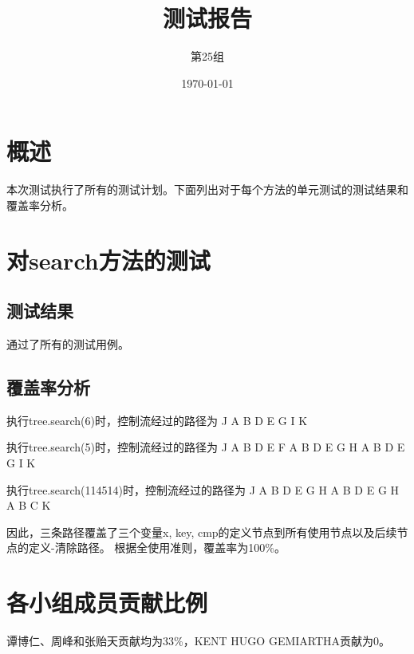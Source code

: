 \documentclass[12pt, a4paper, oneside]{ctexart}
\title{\textbf{测试报告}}
\author{第25组}
\date{\today}
\begin{document}
\maketitle

\section{概述}
本次测试执行了所有的测试计划。下面列出对于每个方法的单元测试的测试结果和覆盖率分析。

\section{对search方法的测试}

\subsection{测试结果}
通过了所有的测试用例。

\subsection{覆盖率分析}
执行tree.search(6)时，控制流经过的路径为 J A B D E G I K

执行tree.search(5)时，控制流经过的路径为 J A B D E F A B D E G H A B D E G I K

执行tree.search(114514)时，控制流经过的路径为 J A B D E G H A B D E G H A B C K

因此，三条路径覆盖了三个变量x, key, cmp的定义节点到所有使用节点以及后续节点的定义-清除路径。
根据全使用准则，覆盖率为100\%。

\section{各小组成员贡献比例}
谭博仁、周峰和张贻天贡献均为33\%，KENT HUGO GEMIARTHA贡献为0。
\end{document}
